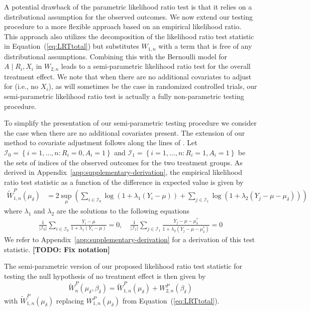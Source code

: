 A potential drawback of the parametric likelihood ratio test is that it relies on a distributional assumption for the observed outcomes. We now extend our testing procedure to a more flexible approach based on an empirical likelihood ratio. This approach also utilizes the decomposition of the likelihood ratio test statistic in Equation~(\ref{eq:LRTtotal}) but substitutes $W_{1,n}$ with a term that is free of any distributional assumptions. Combining this with the Bernoulli model for $A \mid R_i, X_i$ in $W_{2,n}$ leads to a semi-parametric likelihood ratio test for the overall treatment effect. We note that when there are no additional covariates to adjust for (i.e., no $X_i$), as will sometimes be the case in randomized controlled trials, our semi-parametric likelihood ratio test is actually a fully non-parametric testing procedure.

To simplify the presentation of our semi-parametric testing procedure we consider the case when there are no additional covariates present. The extension of our method to covariate adjustment follows along the lines of \citet{owen1991empirical}. Let $\mathcal{I}_0 = \left\{i = 1,\ldots, n : R_i = 0, A_i = 1\right\}$ and $\mathcal{I}_1 = \left\{i = 1,\ldots, n : R_i = 1, A_i = 1\right\}$ be the sets of indices of the observed outcomes for the two treatment groups. As derived in Appendix~\ref{app:supplementary-derivation}, the empirical likelihood ratio test statistic as a function of the difference in expected value is given by
\begin{align}
  \widetilde{W}_{1,n}^P(\mu_\delta) &= 2\sup_{\mu}\left(\sum_{i \in \mathcal{I}_0}\log \left(1 + \lambda_1 (Y_i - \mu)\right) + \sum_{j \in \mathcal{I}_1}\log\left(1 + \lambda_2 (Y_j - \mu - \mu_\delta)\right)\right)\label{eq:nonparametric}
\end{align}
where $\lambda_1$ and $\lambda_2$ are the solutions to the following equations
\begin{align*}
  \frac{1}{|\mathcal{I}_0|}\sum_{i \in \mathcal{I}_0} \frac{Y_i - \mu}{1 + \lambda_1 (Y_i - \mu)} = 0, \quad \frac{1}{|\mathcal{I}_1|}\sum_{j \in \mathcal{I}_1}\frac{Y_j - \mu - \mu_\delta^\ast}{1 + \lambda_2 (Y_j - \mu - \mu_\delta^\ast)} = 0
\end{align*}
We refer to Appendix~\ref{app:supplementary-derivation} for a derivation of this test statistic. \textbf{[TODO: Fix notation]}

The semi-parametric version of our proposed likelihood ratio test statistic for testing the null hypothesis of no treatment effect is then given by
\begin{equation}
  \widetilde{W}_n^P(\mu_\delta, \beta_\delta) = \widetilde{W}_{1,n}^P(\mu_\delta) + W_{2,n}^P(\beta_\delta)\label{eq:LRT_SP_total}
\end{equation}
with $\widetilde{W}_{1,n}^P(\mu_\delta)$ replacing $W_{1,n}^P(\mu_\delta)$ from Equation~(\ref{eq:LRTtotal}).

